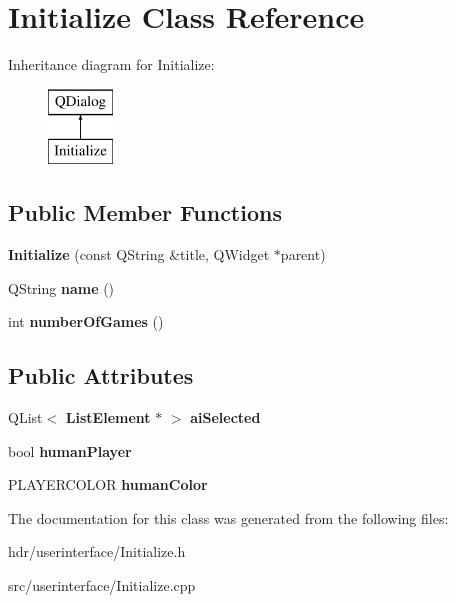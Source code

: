 \section{Initialize Class Reference}
\label{class_initialize}
Inheritance diagram for Initialize\-:\begin{figure}[H]
\begin{center}
\leavevmode
\includegraphics[height=2.000000cm]{class_initialize}
\end{center}
\end{figure}
\subsection*{Public Member Functions}
\begin{DoxyCompactItemize}
\item 
{\bfseries Initialize} (const Q\-String \&title, Q\-Widget $\ast$parent)\label{class_initialize_ac74c7a2fe5cdf5499d0798d4e487f819}

\item 
Q\-String {\bfseries name} ()\label{class_initialize_aad22139b103dbcc5ba568eec9e68e270}

\item 
int {\bfseries number\-Of\-Games} ()\label{class_initialize_a3aa15f1e0f87b9abf1c76af3acb6bd60}

\end{DoxyCompactItemize}
\subsection*{Public Attributes}
\begin{DoxyCompactItemize}
\item 
Q\-List$<$ {\bf List\-Element} $\ast$ $>$ {\bfseries ai\-Selected}\label{class_initialize_a43be312fa27dc86f3bf50bdd7f7eb679}

\item 
bool {\bfseries human\-Player}\label{class_initialize_af02a36f3bd4d873b02c1abea354458aa}

\item 
P\-L\-A\-Y\-E\-R\-C\-O\-L\-O\-R {\bfseries human\-Color}\label{class_initialize_afe9fb1b2a5942539062b8780c993aa2f}

\end{DoxyCompactItemize}


The documentation for this class was generated from the following files\-:\begin{DoxyCompactItemize}
\item 
hdr/userinterface/Initialize.\-h\item 
src/userinterface/Initialize.\-cpp\end{DoxyCompactItemize}
